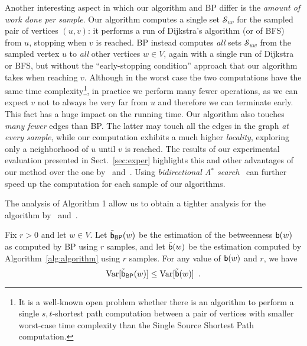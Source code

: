 Another interesting aspect in which our algorithm and \textsf{BP} differ is the
\emph{amount of work done per sample}. Our algorithm computes a single set
$\mathcal{S}_{uv}$ for the sampled pair of vertices $(u,v)$: it performs a run
of Dijkstra's algorithm (or of BFS) from $u$, stopping when $v$ is reached.
\textsf{BP} instead computes \emph{all} sets $\mathcal{S}_{uw}$ from the sampled
vertex $u$ to \emph{all} other vertices $w\in V$, again with a single run of Dijkstra or BFS,
but without the ``early-stopping condition'' approach that our algorithm takes
when reaching $v$. Although in the worst case the two computations have the same time
complexity\footnote{It is a well-known open problem whether there is an
algorithm to perform a single $s,t$-shortest path computation between a pair of
vertices with smaller worst-case time complexity than the Single Source Shortest
Path computation.}, in practice we perform many fewer operations, as we can
expect $v$ not to always be very far from $u$ and therefore we can terminate
early. This fact has a huge impact on the running time. Our algorithm also
touches \emph{many fewer} edges than \textsf{BP}. The latter may touch all the
edges in the graph \emph{at every sample}, while our computation exhibits a much
higher \emph{locality}, exploring only a neighborhood of $u$ until $v$ is
reached. The results of our experimental evaluation presented in
Sect.~\ref{sec:exper} highlights this and other advantages of our method over
the one by~\citet{JacobKLPT05} and~\citet{BrandesP07}. Using \emph{bidirectional A$^*$
search}~\citep{Pohl69,KaindlK97} can further speed up the computation for each
sample of our algorithms.

\ifproof
The analysis of Algorithm 1 allow us to obtain a tighter analysis for the
algorithm by~\citet{BrandesP07} and~\citet{JacobKLPT05}.

\begin{lemma}\label{lem:variance}
  Fix $r>0$ and let $w\in V$. Let $\tilde{\mathsf{b}}_\mathsf{BP}(w)$ be the estimation
  of the betweenness $\mathsf{b}(w)$ as computed by \textsf{BP} using $r$ samples, and
  let $\tilde{\mathsf{b}}(w)$ be the estimation computed by
  Algorithm~\ref{alg:algorithm} using $r$ samples. %
  For any value of $\mathsf{b}(w)$ and $r$, we have
  \[
  \mathrm{Var}[\tilde{\mathsf{b}}_\mathsf{BP}(w)]\le\mathrm{Var}[\tilde{\mathsf{b}}(w)]\enspace.
  \]
\end{lemma}

